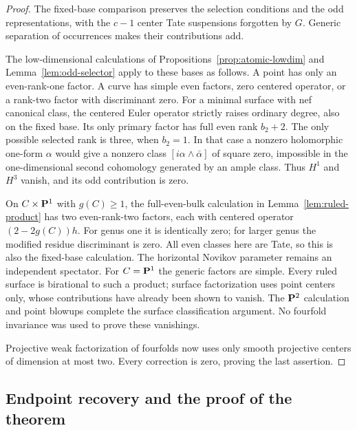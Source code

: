 \begin{proof}
The fixed-base comparison preserves the selection conditions and the odd
representations, with the $c-1$ center Tate suspensions forgotten by $G$.
Generic separation of occurrences makes their contributions add.

The low-dimensional calculations of Propositions~\ref{prop:atomic-lowdim}
and Lemma~\ref{lem:odd-selector} apply to these bases as
follows. A point has only an even-rank-one factor. A curve has simple even
factors, zero centered operator, or a rank-two factor with discriminant
zero. For a minimal surface with nef canonical class, the centered Euler
operator strictly raises ordinary degree, also on the fixed base. Its
only primary factor has full even rank $b_2+2$. The only possible selected
rank is three, when $b_2=1$. In that case a nonzero holomorphic one-form
$\alpha$ would give a nonzero class $[i\alpha\wedge\bar\alpha]$ of square
zero, impossible in the one-dimensional second cohomology generated by
an ample class. Thus $H^1$ and $H^3$ vanish, and its odd contribution is zero.

On $C\times\mathbf P^1$ with $g(C)\geq1$, the full-even-bulk calculation in
Lemma~\ref{lem:ruled-product} has two even-rank-two factors, each with centered operator
$(2-2g(C))h$. For genus one it is identically zero; for larger genus the
modified residue discriminant is zero. All even classes here are Tate,
so this is also the fixed-base calculation. The horizontal Novikov
parameter remains an independent spectator. For $C=\mathbf P^1$ the generic
factors are simple. Every ruled surface is birational to such a product;
surface factorization uses point centers only, whose contributions have
already been shown to vanish. The $\mathbf P^2$ calculation and point blowups
complete the surface classification argument. No fourfold invariance was
used to prove these vanishings.

Projective weak factorization of fourfolds now uses only smooth projective
centers of dimension at most two. Every correction is zero, proving the
last assertion.
%
%
\end{proof}

\subsection{Endpoint recovery and the proof of the theorem}

